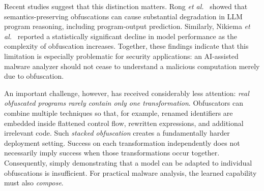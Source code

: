 Recent studies suggest that this distinction matters.
Rong {\em et al.}~\cite{ase26} showed that semantics-preserving
obfuscations can cause substantial degradation in LLM program
reasoning, including program-output prediction. Similarly, Nikiema
{\em et al.}~\cite{nikiema2025codebarrierllmsactually} reported a
statistically significant decline in model performance as the
complexity of obfuscation increases. Together, these findings indicate
that this limitation is especially problematic
for security applications: an AI-assisted malware analyzer should not
cease to understand a malicious computation merely due to obfuscation.


An important challenge, however, has received considerably less
attention: \emph{real obfuscated programs rarely contain only one
transformation}. Obfuscators can combine multiple techniques so that,
for example, renamed identifiers are embedded inside flattened control
flow, rewritten expressions, and additional irrelevant code. Such
\emph{stacked obfuscation} creates a fundamentally harder deployment
setting. Success on each transformation independently does not
necessarily imply success when those transformations occur together.
Consequently, simply demonstrating that a model can be adapted to
individual obfuscations is insufficient. For practical malware
analysis, the learned capability must also \emph{compose}.


